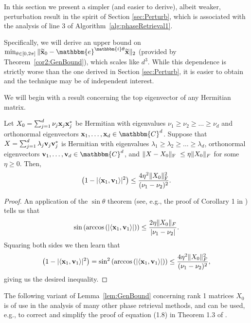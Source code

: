 In this section we present a simpler (and easier to derive), albeit weaker,  perturbation result in the spirit of Section \ref{sec:Perturb}, which is associated with the analysis of line 3 of Algorithm~\ref{alg:phaseRetrieval1}.

Specifically, we will derive an upper bound on $\min_{\theta\in[0,2\pi]} \Vert \tx_0 - \mathbbm{e}^{\mathbbm{i}\theta}\tx \Vert_2$ (provided by Theorem~\ref{cor2:GenBound}), which scales like $d^3$.  While this dependence is strictly worse than the one derived in Section \ref{sec:Perturb}, it is easier to obtain and the technique may be of independent interest. 

We will begin with a result concerning the top eigenvector of any Hermitian matrix.

\begin{lemma}\label{lem:GenBound}
Let $X_0 = \sum^d_{j=1} \nu_j \mathbf x_j\mathbf x_j^*$ be Hermitian with eigenvalues $\nu_1 \geq \nu_2 \geq \dots \geq \nu_d$ and orthonormal eigenvectors $\x_1, \dots, \x_d \in \mathbbm{C}^d$.  Suppose that $X = \sum^d_{j=1} \lambda_j \mathbf v_j\mathbf v_j^*$ is Hermitian with eigenvalues $\lambda_1 \geq \lambda_2 \geq \dots \geq \lambda_d$, orthonormal eigenvectors $\v_1, \dots, \v_d \in \mathbbm{C}^d$, and $\Vert X-X_0 \Vert_{\rm F}~\leq \eta \Vert X_0 \Vert_F$ for some $\eta \geq 0$.  Then,
\[ \left( 1 - | \langle \mathbf x_1, \mathbf v_1 \rangle |^2 \right)  \leq  \frac{4 \eta^2 \Vert X_0 \Vert^2_{\rm F} }{(\nu_1- \nu_2)^2} .\]
\end{lemma}

\begin{proof}
An application of the $\sin \theta$ theorem \cite{davis1970rotation,stewart1990matrix} (see, e.g., the proof of Corollary 1 in \cite{yu2015useful}) tells us that 
\begin{equation*}
\sin \left( \arccos \left( | \langle \mathbf x_1, \mathbf v_1 \rangle | \right) \right) \leq \frac{2 \eta \Vert X_0 \Vert_F}{|\nu_1 - \nu_2|}.
\end{equation*}
Squaring both sides we then learn that 
\begin{equation}
 \left( 1 - | \langle \mathbf x_1, \mathbf v_1 \rangle |^2 \right)  = \sin^2 \left( \arccos \left( | \langle \mathbf x_1, \mathbf v_1 \rangle | \right) \right) \leq \frac{4 \eta^2 \Vert X_0 \Vert^2_F}{(\nu_1 - \nu_2)^2},
\end{equation}
giving us the desired inequality.  
\end{proof}

The following variant of Lemma~\ref{lem:GenBound} concerning rank 1 matrices $X_0$ is of use in the analysis of many other phase retrieval methods, and can be used, e.g., to correct and simplify the proof of equation (1.8) in Theorem 1.3 of \cite{candes2014solving}.

